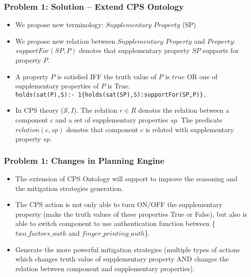 \documentclass{beamer}
\begin{document}
\begin{frame}[fragile]
	\frametitle{Problem 1: Solution -- Extend CPS Ontology}
	\begin{itemize}
		\item We propose new terminology: $Supplementary$ $Property$ (SP)
		\item We propose new relation between $Supplementary$ $Property$ and $Property$: $supportFor(SP,P)$ denotes that supplementary property $SP$ supports for property $P$.
		\item A property $P$ is satisfied IFF the truth value of $P$ is $true$ OR one of supplementary properties of $P$ is True. \\
		{\tt holds(sat(P),S):- 1\{holds(sat(SP),S):supportFor(SP,P)\}.}
		\item In CPS theory ($\mathcal{S},I$). The relation $r \in R$ denotes the relation between a component $c$ and a set of supplementary properties $sp$. The predicate $relation(c,sp)$ denotes that component $c$ is related with supplementary property $sp$.  
	\end{itemize}
\end{frame}

\begin{frame}[fragile]
	\frametitle{Problem 1: Changes in Planning Engine}
	\begin{itemize}
		\item The extension of CPS Ontology will support to improve the reasoning and the mitigation strategies generation.
		\item The CPS action is not only able to turn ON/OFF the supplementary property (make the truth values of these properties True or False), but also is able to switch component to use authentication function between \{$two\_factors\_auth$ and $finger\_printing\_auth$\}.
		\item Generate the more powerful mitigation strategies (multiple types of actions which changes truth value of supplementary property AND changes the relation between component and supplementary properties). 	   
	\end{itemize}
\end{frame}

\end{document}
